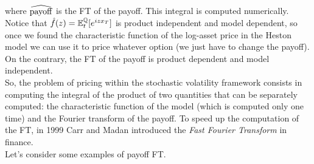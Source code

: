 where $\widehat{\operatorname{payoff}}$ is the FT of the payoff. This integral is computed numerically. Notice that $\hat{f}(z) = \mathbb{E}^{\mathbb{Q}}_t[e^{izx_T}]$ is product independent and model dependent, so once we found the characteristic function of the log-asset price in the Heston model we can use it to price whatever option (we just have to change the payoff). On the contrary, the FT of the payoff is product dependent and model independent.\\
So, the problem of pricing within the stochastic volatility framework consists in computing the integral of the product of two quantities that can be separately computed: the characteristic function of the model (which is computed only one time) and the Fourier transform of the payoff. To speed up the computation of the FT, in 1999 Carr and Madan introduced the \emph{Fast Fourier Transform} in finance. \\ %
Let's consider some examples of payoff FT.

